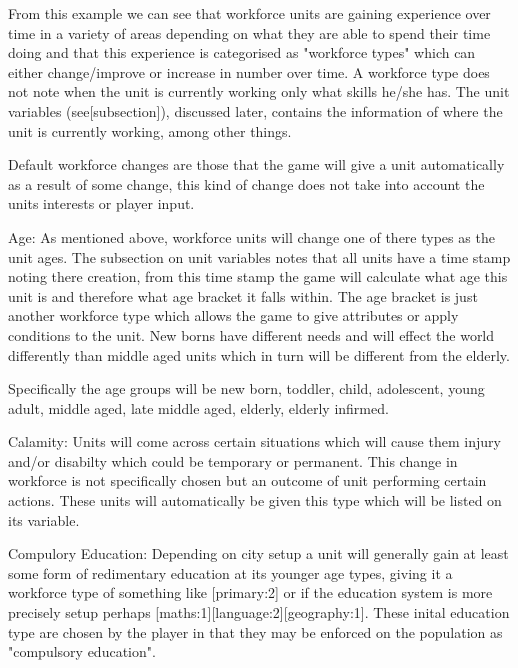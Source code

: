 From this example we can see that workforce units are gaining experience over time in a variety of areas depending on what they are able to spend their time doing and that this experience is categorised as "workforce types" which can either change/improve or increase in number over time. A workforce type does not note when the unit is currently working only what skills he/she has. The unit variables (see[subsection]), discussed later, contains the information of where the unit is currently working, among other things.





Default workforce changes are those that the game will give a unit automatically as a result of some change, this kind of change does not take into account the units interests or player input.

Age:
As mentioned above, workforce units will change one of there types as the unit ages. The subsection on unit variables notes that all units have a time stamp noting there creation, from this time stamp the game will calculate what age this unit is and therefore what age bracket it falls within. The age bracket is just another workforce type which allows the game to give attributes or apply conditions to the unit. New borns have different needs and will effect the world differently than middle aged units which in turn will be different from the elderly. 

Specifically the age groups will be new born, toddler, child, adolescent, young adult, middle aged, late middle aged, elderly, elderly infirmed. 

Calamity:
Units will come across certain situations which will cause them injury and/or disabilty which could be temporary or permanent. This change in workforce is not specifically chosen but an outcome of unit performing certain actions. These units will automatically be given this type which will be listed on its variable.  


Compulory Education:
Depending on city setup a unit will generally gain at least some form of redimentary education at its younger age types, giving it a workforce type of something like [primary:2] or if the education system is more precisely setup perhaps [maths:1][language:2][geography:1]. These inital education type are chosen by the player in that they may be enforced on the population as "compulsory education".

